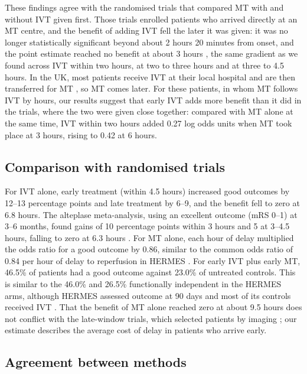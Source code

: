 These findings agree with the randomised trials that compared MT with and without IVT given first. Those trials enrolled patients who arrived directly at an MT centre, and the benefit of adding IVT fell the later it was given: it was no longer statistically significant beyond about 2 hours 20 minutes from onset, and the point estimate reached no benefit at about 3 hours \cite{kaesmacher2024}, the same gradient as we found across IVT within two hours, at two to three hours and at three to 4.5 hours. In the UK, most patients receive IVT at their local hospital and are then transferred for MT \cite{allen2022}, so MT comes later. For these patients, in whom MT follows IVT by hours, our results suggest that early IVT adds more benefit than it did in the trials, where the two were given close together: compared with MT alone at the same time, IVT within two hours added 0.27 log odds units when MT took place at 3 hours, rising to 0.42 at 6 hours.

\subsection{Comparison with randomised trials}

For IVT alone, early treatment (within 4.5 hours) increased good outcomes by 12--13 percentage points and late treatment by 6--9, and the benefit fell to zero at 6.8 hours. The alteplase meta-analysis, using an excellent outcome (mRS 0--1) at 3--6 months, found gains of 10 percentage points within 3 hours and 5 at 3--4.5 hours, falling to zero at 6.3 hours \cite{emberson_effect_2014}. For MT alone, each hour of delay multiplied the odds ratio for a good outcome by 0.86, similar to the common odds ratio of 0.84 per hour of delay to reperfusion in HERMES \cite{saver2016}. For early IVT plus early MT, 46.5\% of patients had a good outcome against 23.0\% of untreated controls. This is similar to the 46.0\% and 26.5\% functionally independent in the HERMES arms, although HERMES assessed outcome at 90 days and most of its controls received IVT \cite{goyal2016}. That the benefit of MT alone reached zero at about 9.5 hours does not conflict with the late-window trials, which selected patients by imaging \cite{nogueira2018,albers2018}; our estimate describes the average cost of delay in patients who arrive early.

\subsection{Agreement between methods}

